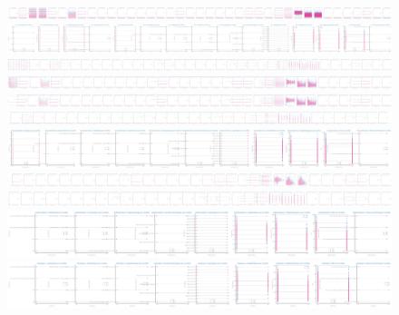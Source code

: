 \documentclass[10pt]{extarticle}
\begin{document}
\begin{figure}[H]
\centering\includegraphics[scale=0.05]{images/dataset1/data_profiling/CovidPos_sparsity_State_per_class.png}
\includegraphics[scale=0.05]{images/dataset1/data_profiling/CovidPos_sparsity_Sex_per_class.png}
\includegraphics[scale=0.05]{images/dataset1/data_profiling/CovidPos_sparsity_GeneralHealth_per_class.png}
\includegraphics[scale=0.05]{images/dataset1/data_profiling/CovidPos_sparsity_PhysicalHealthDays_per_class.png}
\includegraphics[scale=0.05]{images/dataset1/data_profiling/CovidPos_sparsity_MentalHealthDays_per_class.png}
\includegraphics[scale=0.05]{images/dataset1/data_profiling/CovidPos_sparsity_LastCheckupTime_per_class.png}
\includegraphics[scale=0.05]{images/dataset1/data_profiling/CovidPos_sparsity_PhysicalActivities_per_class.png}
\includegraphics[scale=0.05]{images/dataset1/data_profiling/CovidPos_sparsity_SleepHours_per_class.png}
\includegraphics[scale=0.05]{images/dataset1/data_profiling/CovidPos_sparsity_RemovedTeeth_per_class.png}
\includegraphics[scale=0.05]{images/dataset1/data_profiling/CovidPos_sparsity_HadHeartAttack_per_class.png}
\includegraphics[scale=0.05]{images/dataset1/data_profiling/CovidPos_sparsity_HadAngina_per_class.png}

\end{figure}
\end{document}
